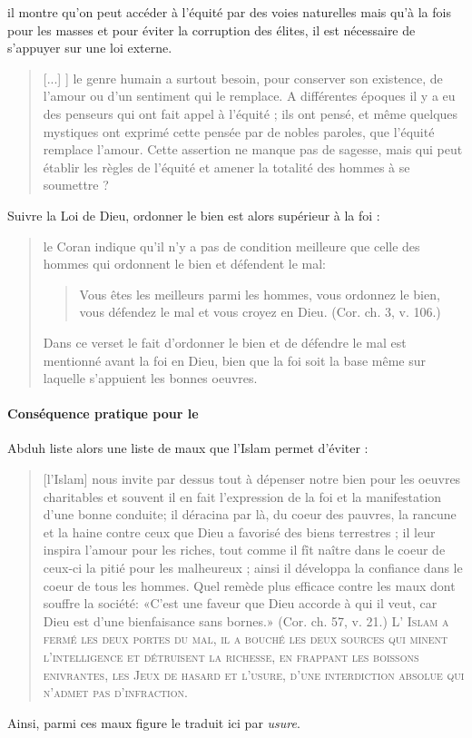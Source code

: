 il montre qu'on peut accéder à l'équité par des voies naturelles mais qu'à la fois pour les masses et pour éviter la corruption des élites, il est nécessaire de s'appuyer sur une loi externe.
\begin{quote}
[...] ] le genre humain
a surtout besoin, pour conserver son existence, de l'amour ou d'un
sentiment qui le remplace.
A différentes époques il y a eu des penseurs qui ont fait appel à
l'équité ; ils ont pensé, et même quelques mystiques ont exprimé cette
pensée par de nobles paroles, que l'équité remplace l'amour. Cette
assertion ne manque pas de sagesse, mais qui peut établir les
règles de l'équité et amener la totalité des hommes à se soumettre ?
\end{quote}

Suivre la Loi de Dieu, ordonner le bien est alors supérieur à la foi : 

\begin{quote}
  le Coran indique
qu'il n'y a pas de condition meilleure que celle des hommes qui ordonnent
le bien et défendent le mal: \begin{quote}
    Vous êtes les meilleurs parmi les hommes,
vous ordonnez le bien, vous défendez le mal et vous croyez en Dieu. (Cor. ch. 3, v. 106.) 
\end{quote} 
 
Dans ce verset le fait d'ordonner le bien et de
défendre le mal est mentionné avant la foi en Dieu, bien que la foi soit la base même sur laquelle s'appuient les bonnes oeuvres. 
\end{quote}

\paragraph{Conséquence pratique pour le \riba}
Abduh liste alors une liste de maux que l'Islam permet d'éviter : 
\begin{quote}

[l'Islam] nous invite par dessus tout à dépenser notre bien pour les oeuvres
charitables et souvent il en fait l'expression de la foi et la manifestation
d'une bonne conduite; il déracina par là, du coeur des pauvres, la rancune
et la haine contre ceux que Dieu a favorisé des biens terrestres ; il leur
inspira l'amour pour les riches, tout comme il fît naître dans le coeur de
ceux-ci la pitié pour les malheureux ; ainsi il développa la confiance dans
le coeur de tous les hommes. Quel remède plus efficace contre les maux
dont souffre la société: «C'est une faveur que Dieu accorde à qui il veut,
car Dieu est d'une bienfaisance sans bornes.» (Cor. ch. 57, v. 21.)
\textsc{L' Islam a fermé les deux portes du mal, il a bouché les deux sources
qui minent l'intelligence et détruisent la richesse, en frappant les boissons
enivrantes, les Jeux de hasard et l'usure, d'une interdiction absolue qui
n'admet pas d'infraction.}
\end{quote}
Ainsi, parmi ces maux figure le \riba traduit ici par \textit{usure}.


